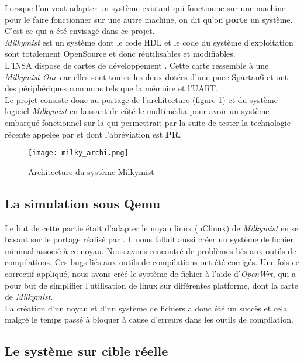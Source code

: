 
Lorsque l'on veut adapter un système existant qui fonctionne sur une machine pour le faire fonctionner sur une autre machine, on dit qu'on \textbf{porte} un système. C'est ce qui a été envisagé dans ce projet.\\
\textit{Milkymist} est un système dont le code HDL et le code  du système d'exploitation sont totalement OpenSource et donc réutilisables et modifiables.\\
L'INSA dispose de cartes de développement \nexys. Cette carte ressemble à une \textit{Milkymist One} car elles sont toutes les deux dotées d'une puce \fpga{} Spartan6 et ont des périphériques communs tels que la mémoire et l'UART.\\

Le projet consiste donc au portage de l'architecture (figure \ref{milky-archi}) et du système logiciel \textit{Milkymist} en laissant de côté le multimédia pour avoir un système embarqué fonctionnel sur la \nexys qui permettrait par la suite de tester la technologie récente appelée  par  et dont l'abréviation est \textbf{PR}.

\begin{figure}[h!]
\centering
\texttt{[image: milky\_archi.png]}
\caption{Architecture du système Milkymist}
\label{milky-archi}
\end{figure}

\subsection{La simulation sous Qemu}

Le but de cette partie était d'adapter le noyau linux (uClinux) de \textit{Milkymist} en se basant sur le portage réalisé par . Il nous fallait aussi créer un système de fichier minimal associé à ce noyau. Nous avons rencontré de problèmes liés aux outils de compilations. Ces bugs liés aux outils de compilations ont été corrigés. Une fois ce correctif appliqué, nous avons créé le système de fichier à l'aide d'\textit{OpenWrt}, qui a pour but de simplifier l'utilisation de linux sur différentes platforme, dont la carte de \textit{Milkymist}.\\
La création d'un noyau et d'un système de fichiers a donc été un succès et cela malgré le temps passé à bloquer à cause d'erreurs dans les outils de compilation.

\subsection{Le système sur cible réelle}

